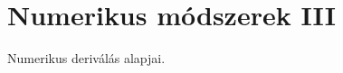 \documentclass[../../main.tex]{subfiles}
\begin{document}
\section{Numerikus módszerek III}

\begin{fulltheorem}
	Numerikus deriválás alapjai.
\end{fulltheorem}
\end{document}

